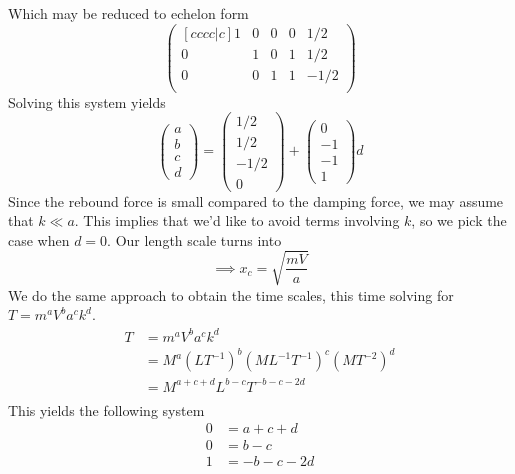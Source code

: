 \documentclass[12pt]{article}
\begin{document}
Which may be reduced to echelon form
\begin{equation*}
  \begin{pmatrix}[cccc|c]
    1 & 0 & 0 & 0 & 1/2 \\
    0 & 1 & 0 & 1 & 1/2 \\
    0 & 0 & 1 & 1 & -1/2 \\
  \end{pmatrix}
\end{equation*}
Solving this system yields
\begin{equation*}
  \begin{pmatrix}
    a \\ b \\ c \\ d
  \end{pmatrix} =
  \begin{pmatrix}
    1/2 \\ 1/2 \\ -1/2 \\ 0
  \end{pmatrix} +
  \begin{pmatrix}
    0 \\ -1 \\ -1 \\ 1
  \end{pmatrix}
  d
\end{equation*}
Since the rebound force is small compared to the damping force, we may assume
that $k\ll a$. This implies that we'd like to avoid terms involving $k$, so we
pick the case when $d=0$. Our length scale turns into
\begin{equation}
  \label{eq:4-length-scale}
  \implies x_c = \sqrt{\frac{mV}{a}}
\end{equation}
We do the same approach to obtain the time scales, this time solving for
$T=m^aV^ba^ck^d$.
\begin{equation*}
  \begin{aligned}
    T &= m^aV^ba^ck^d \\
    &= M^{a}(LT^{-1})^b(ML^{-1}T^{-1})^c(MT^{-2})^d \\
    &= M^{a+c+d}L^{b-c}T^{-b-c-2d} \\
  \end{aligned}
\end{equation*}
This yields the following system
\begin{equation*}
  \begin{aligned}
    0 &= a + c + d \\
    0 &= b - c \\
    1 &= -b  - c - 2d \\
  \end{aligned}
\end{equation*}
\end{document}
